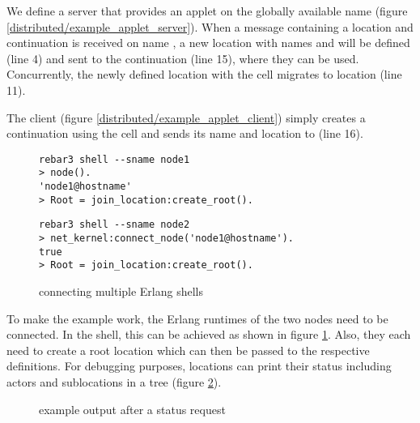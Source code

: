 \begin{example}[Applet]

  We define a server that provides an applet on the globally available name
   (figure \ref{distributed/example_applet_server}).
  When a message containing a location  and continuation
  is received on name ,
  a new location with names  and  will be defined (line 4)
  and sent to the continuation (line 15), where they can be used.
  Concurrently, the newly defined location with the cell migrates to location
   (line 11).

  The client (figure \ref{distributed/example_applet_client})
  simply creates a continuation using the cell and sends its name and location
  to  (line 16).

  \begin{figure}
    \begin{lstlisting}
rebar3 shell --sname node1
> node().
'node1@hostname'
> Root = join_location:create_root().
    \end{lstlisting}
    \begin{lstlisting}
rebar3 shell --sname node2
> net_kernel:connect_node('node1@hostname').
true
> Root = join_location:create_root().
    \end{lstlisting}
  \caption{connecting multiple Erlang shells}
  \label{connecting_shells}
  \end{figure}



\end{example}

To make the example work, the Erlang runtimes of the two nodes need to be
connected. In the shell, this can be achieved as shown in figure
\ref{connecting_shells}.
Also, they each need to create a root location
which can then be passed to the respective definitions.
For debugging purposes, locations can print their status including
actors and sublocations in a tree (figure \ref{print_status}).

\begin{figure}
  
    \vspace{-0.5cm}
    \caption{example output after a status request}
    \label{print_status}
\end{figure}
